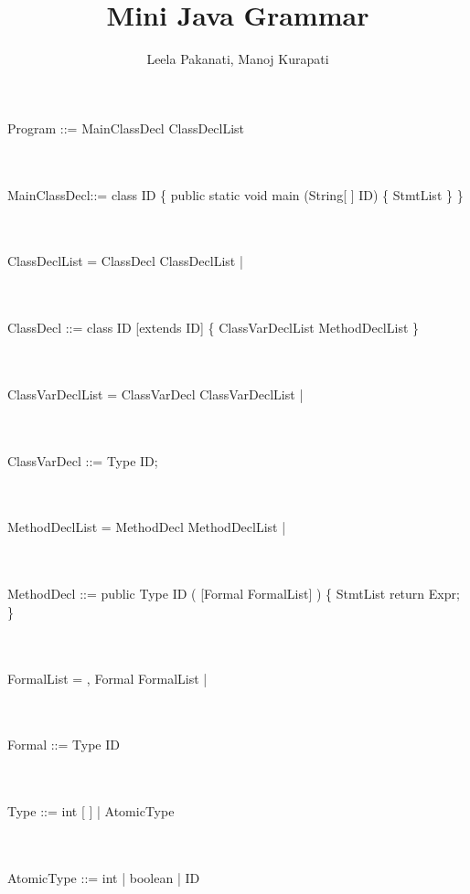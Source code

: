 \documentclass[a4paper,portrait,12pt]{article}
\title{Mini Java Grammar}
\date{}
\author{Leela Pakanati, Manoj Kurapati}
\begin{document}
\maketitle

\hspace*{-.25in}Program ::=	MainClassDecl ClassDeclList 

\\~\\
MainClassDecl::=	class ID \{ public static void main (String[ ] ID) \{ StmtList \} \} 

\\~\\
ClassDeclList =	ClassDecl ClassDeclList				\newline
\hspace*{.625in} | \epsilon

\\~\\
ClassDecl ::=	class ID [extends ID] \{ ClassVarDeclList MethodDeclList \} 

\\~\\
ClassVarDeclList =	ClassVarDecl ClassVarDeclList	\newline
\hspace*{.625in} | \epsilon

\\~\\
ClassVarDecl ::=	Type ID; 

\\~\\
MethodDeclList =	MethodDecl MethodDeclList		\newline
\hspace*{.625in} | \epsilon

\\~\\
MethodDecl ::=	public Type ID ( [Formal FormalList] ) \{ StmtList return Expr; \} 

\\~\\
FormalList =	, Formal FormalList					\newline
\hspace*{.625in} | \epsilon

\\~\\
Formal ::=	Type ID

\\~\\
Type ::=	int [ ] | AtomicType

\\~\\
AtomicType ::=	int | boolean | ID 
\end{document}
